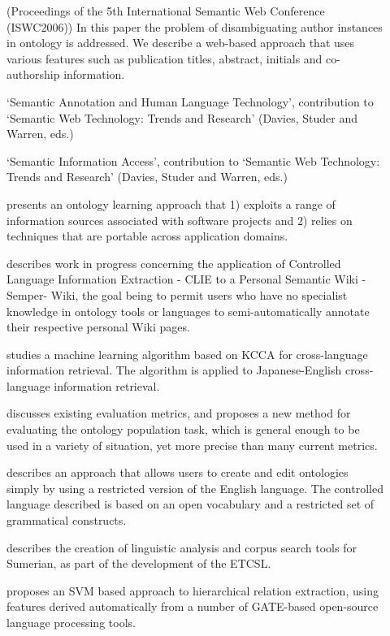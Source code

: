 \begin{description}

\item[\cite{Aswani06}] (Proceedings of the 5th International Semantic Web Conference (ISWC2006))
In this paper the problem of disambiguating author instances in
ontology is addressed. We describe a web-based approach that uses
various features such as publication titles, abstract, initials and
co-authorship information.

\item[\cite{Bon06a}] `Semantic Annotation and Human Language Technology', contribution to `Semantic Web Technology: Trends and Research' (Davies, Studer and Warren, eds.)


\item[\cite{Bon06b}] `Semantic Information Access', contribution to `Semantic Web Technology: Trends and Research' (Davies, Studer and Warren, eds.)

\item[\cite{Bon06c}] presents an ontology learning approach that 1) exploits a range of
information sources associated with software projects and 2) relies on
techniques that are portable across application domains.

\item[\cite{Dav06a}] describes work in progress concerning the application of Controlled Language
Information Extraction - CLIE to a Personal Semantic Wiki - Semper-
Wiki, the goal being to permit users who have no specialist knowledge
in ontology tools or languages to semi-automatically annotate their
respective personal Wiki pages.


\item[\cite{Yaoyong06a}] studies a machine learning algorithm based on KCCA for cross-language information retrieval. The algorithm is applied to Japanese-English cross-language information retrieval.

\item[\cite{Maynard06a}] discusses existing evaluation metrics, and proposes a new method for evaluating the ontology population task, which is general enough to be used in a variety of situation, yet more precise than many current metrics.

\item[\cite{Tablan06a}] describes an approach that allows users to create and edit ontologies simply by using a restricted version of the English language. The controlled language described
is based on an open vocabulary and a restricted set of grammatical
constructs.

\item[\cite{Tablan06b}] describes the creation of linguistic analysis and corpus search tools for Sumerian, as part of the development of the ETCSL.


\item[\cite{Wang06}] proposes an SVM based approach
to hierarchical relation extraction, using features derived
automatically from a number of GATE-based open-source language
processing tools.


\end{description}

